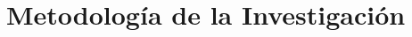 \documentclass[palatino,miniheader]{apuntesURJC}
\begin{document}


\chapter{Metodología de la Investigación}
\end{document}
